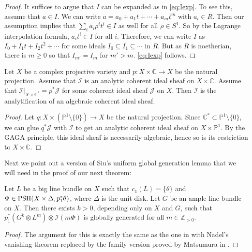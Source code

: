 \begin{proof}
It suffices to argue that $I$ can be expanded as in \eqref{eq:Iexp}.
To see this, assume that $a\in I$. We can write $a=a_0+a_1t+\cdots+a_mt^m$ with $a_i\in R$. Then our assumption implies that $\sum_i a_i \rho^i t^i\in I$ as well for all $\rho\in S^1$. So by the Lagrange interpolation formula, $a_it^i\in I$ for all $i$. Therefore, we can write $I$ as $I_0+I_1t+I_2t^2+\cdots$ for some ideals $I_0\subseteq I_1\subseteq \cdots$ in $R$. But as $R$ is noetherian, there is $m\geq 0$ so that $I_{m'}=I_m$ for $m'>m$. \eqref{eq:Iexp} follows.
\end{proof}

\begin{lemma}\label{lma:GAGA}
Let $X$ be a complex projective variety and $p:X\times \mathbb{C}\rightarrow X$ be the natural projection. Assume that $\mathcal{I}$ is an analytic coherent ideal sheaf on $X\times \mathbb{C}$. Assume that $\mathcal{I}|_{X \times \mathbb C^*}=p^*\mathcal{J}$ for some coherent ideal sheaf $\mathcal{J}$ on $X$. Then $\mathcal{I}$ is the analytification of an algebraic coherent ideal sheaf.
\end{lemma}



\begin{proof}
    Let $q:X\times (\mathbb{P}^1\setminus \{0\})\rightarrow X$ be the natural projection. Since $\mathbb C^* \subset \mathbb{P}^1\setminus \{0\}$, we can glue $q^*\mathcal{J}$ with $\mathcal{I}$ to get an analytic coherent ideal sheaf on $X\times \mathbb{P}^1$. By the GAGA principle, this ideal sheaf is necessarily algebraic, hence so is its restriction to $X\times \mathbb{C}$.
\end{proof}

Next we point out a version of Siu's uniform global generation lemma \cite{Siu88} that we will need in the proof of our next theorem:

\begin{lemma}\label{lma:Siu_global_uniform_generatedness} Let $L$ be a big line bundle on $X$ such that $c_1(L) = \{\theta\}$ and $\Phi \in \mathrm{PSH}(X\times \Delta, p_1^*\theta)$, where $\Delta$ is the unit disk. Let $G$ be an ample line bundle on $X$. Then there exists $k>0$, depending only on $X$ and $G$, such that $p_1^*(G^k \otimes L^m)\otimes \mathcal I(m \Phi)$ is globally generated for all $m \in \mathbb{Z}_{>0}$.
\end{lemma}

\begin{proof} The argument for this is exactly the same as the one in \cite[Lemma~5.6]{BBJ21} with Nadel's vanishing theorem replaced by the family version proved by Matsumura in \cite[Theorem~1.7]{Mat16}.
\end{proof}







